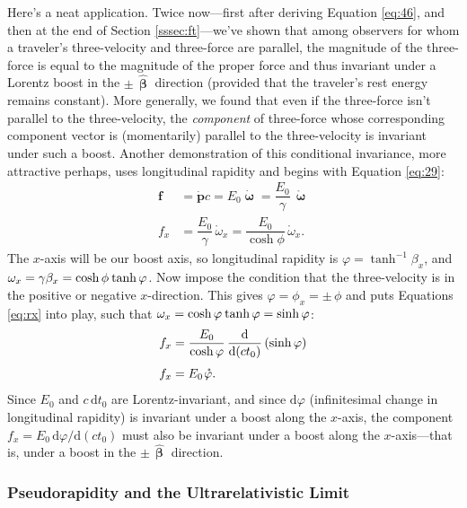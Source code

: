 \documentclass[12pt]{article}
\renewcommand{\vv}[1]{\mathbf{#1}}
\newcommand{\dd}[1]{\mathrm{d}#1}
\newcommand{\hatbeta}{\bm{\hat{\upbeta}}}
\newcommand{\vvomega}{\bm{\upomega}}
\begin{document}
Here's a neat application. Twice now---first after deriving Equation \ref{eq:46}, and then at the end of Section \ref{sssec:ft}---we've shown that among observers for whom a traveler's three-velocity and three-force are parallel, the magnitude of the three-force is equal to the magnitude of the proper force and thus invariant under a Lorentz boost in the $\pm \, \hatbeta$ direction (provided that the traveler's rest energy remains constant). More generally, we found that even if the three-force isn't parallel to the three-velocity, the \emph{component} of three-force whose corresponding component vector is (momentarily) parallel to the three-velocity is invariant under such a boost. Another demonstration of this conditional invariance, more attractive perhaps, uses longitudinal rapidity and begins with Equation \ref{eq:29}:
\begin{equation*}
\begin{split}
\vv f &= \dot{\vv p} c = E_0 \dot{\vvomega} =  \dfrac{E_0}{\gamma} \, \mathring{\vvomega} \\[3pt]
f_x & = \dfrac{E_0}{\gamma} \, \mathring{\omega}_x = \dfrac{E_0}{\cosh{\phi}} \, \mathring{\omega}_x .
\end{split}
\end{equation*}
The $x$-axis will be our boost axis, so longitudinal rapidity is $\varphi = \tanh^{-1}{\beta_x}$, and $\omega_x = \gamma \beta_x = \cosh{\phi} \mkern1mu \tanh{\varphi}$. Now impose the condition that the three-velocity is in the positive or negative $x$-direction. This gives $\varphi = \phi_x = \pm \, \phi$ and puts Equations \ref{eq:rx} into play, such that $\omega_x = \cosh{\varphi} \mkern1mu \tanh{\varphi} = \sinh{\varphi}$:
\begin{equation*}
\begin{split}
f_x &= \dfrac{E_0}{\cosh{\varphi}} \, \dfrac{\dd}{\dd (c t_0)} \left( \sinh{\varphi} \right)  \\[3pt]
f_x &= E_0 \mkern1.5mu \mathring{\varphi} .
\end{split}
\end{equation*}
Since $E_0$ and $c \, \dd t_0$ are Lorentz-invariant, and since $\dd \varphi$ (infinitesimal change in longitudinal rapidity) is invariant under a boost along the $x$-axis, the component $f_x = E_0 \, \dd \varphi / \dd (c t_0)$ must also be invariant under a boost along the $x$-axis---that is, under a boost in the $\pm \, \hatbeta$ direction.


\subsubsection{Pseudorapidity and the Ultrarelativistic Limit}
\end{document}

